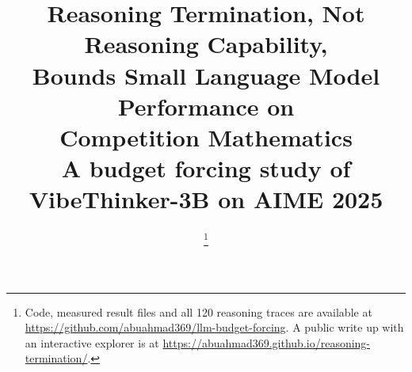 \documentclass[conference]{IEEEtran}
\newif\ifdraft
\newcommand{\writehere}[2]{%
  \ifdraft
    {\color{orange!75!black}\small\textbf{[WRITE: #1]}\itshape\ #2\par}
    \medskip
  \fi}
\begin{document}
\title{Reasoning Termination, Not Reasoning Capability,\\
Bounds Small Language Model Performance on\\
Competition Mathematics\\
{\footnotesize A budget forcing study of VibeThinker-3B on AIME 2025}
}

\author{
\thanks{Code, measured result files and all 120 reasoning traces are available at
\protect\url{https://github.com/abuahmad369/llm-budget-forcing}. A public write up
with an interactive explorer is at
\protect\url{https://abuahmad369.github.io/reasoning-termination/}.}
}

\maketitle

\ifdraft
{\color{red!70!black}\footnotesize\itshape
DRAFT NOTE, not part of the report. The coloured passages below are writing
prompts, one per paragraph. Replace each one with your own text and delete the
surrounding command. When every prompt is gone, change \texttt{drafttrue} to
\texttt{draftfalse} near the top of the source and recompile; the colour and these
notes vanish and you see the real page count.\par}
\medskip
\fi

\begin{abstract}
\writehere{Abstract, roughly 150 to 250 words}{
The IEEE template says do not use symbols, special characters, footnotes or
mathematics in the abstract, so write it in plain prose. Cover five things in
order. One, the topic: compact reasoning models now match much larger ones on
mathematics benchmarks. Two, the gap: those scores come from runs with no token
limit and nobody reports what a realistic limit costs. Three, the method: a three
billion parameter model evaluated on thirty competition problems, four samples
each, across budgets from one thousand to thirty two thousand tokens, weights
never modified, logging why every generation stopped. Four, the results: samples
that finished were almost always correct, samples cut off scored zero for want of
a written answer, and forcing the model to commit recovered seven to thirteen
points without ever destroying a correct answer. Five, the significance: any
benchmark that caps generation is measuring stopping behaviour and reporting it as
reasoning ability.}
\end{abstract}
\end{document}
